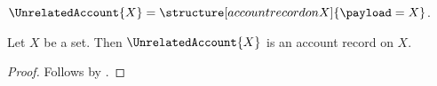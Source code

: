 \begin{definition}\label{account_unrelated_provider}
    $\UnrelatedAccount{X}=\structure[account record on X]{\payload=X}$.
\end{definition}

\begin{classification}\label{account_unrelated_result}
    Let $X$ be a set.
    Then $\UnrelatedAccount{X}$ is an account record on $X$.
\end{classification}
\begin{proof}
    Follows by .
\end{proof}
